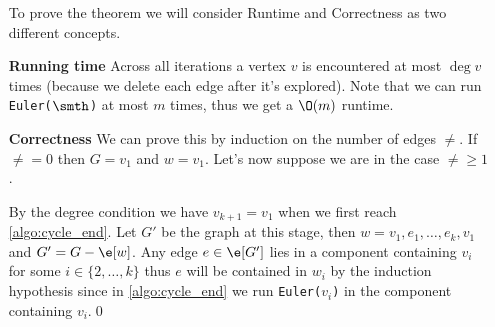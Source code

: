 \begin{prf}
    \begin{itemize}
        To prove the theorem we will consider Runtime and Correctness as two different concepts.
        \item [\textbf{Running time}] Across all iterations a vertex $v$ is encountered at most $\deg{v}$ times (because we delete each edge after it's explored). Note that we can run \texttt{Euler($\smth$)} at most $m$ times, thus we get a $\O(m)$ runtime.
        \item [\textbf{Correctness}] We can prove this by induction on the number of edges $\ne$. If $\ne = 0$ then $G = v_1$ and $w = v_1$. Let's now suppose we are in the case $\ne \geq 1$.
        
        By the degree condition we have $v_{k + 1} = v_1$ when we first reach \ref{algo:cycle_end}. Let $G'$ be the graph at this stage, then $w = v_1, e_1, \dots, e_k, v_1$ and $G' = G - \e[w]$. Any edge $e \in \e[G']$ lies in a component containing $v_i$ for some $i \in \{2, \dots, k\}$ thus $e$ will be contained in $w_i$ by the induction hypothesis since in \ref{algo:cycle_end} we run \texttt{Euler($v_i$)} in the component containing $v_i$.\qed
    \end{itemize}
\end{prf}